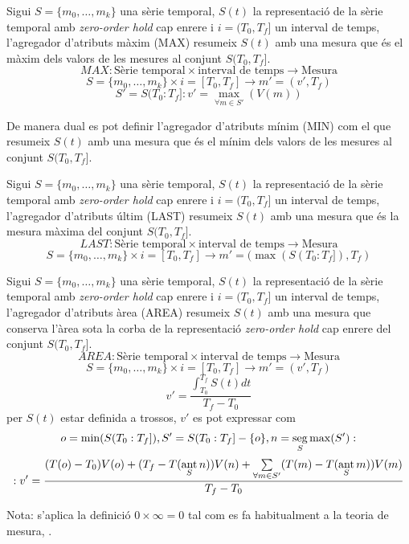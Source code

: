 \begin{definition}
  Sigui $S=\{m_0,\ldots,m_k\}$ una sèrie temporal, $S(t)$ la
  representació de la sèrie temporal amb \emph{zero-order hold} cap
  enrere i $i=(T_0,T_f]$ un interval de temps, l'agregador d'atributs màxim
  (MAX) resumeix $S(t)$ amb una mesura que és el màxim dels valors
  de les mesures al conjunt $S(T_0,T_f]$.
\[
MAX: \text{Sèrie temporal} \times \text{interval de temps} \longrightarrow \text{Mesura}
\]
\[
S=\{m_0,\ldots,m_k\} \times i=[T_0,T_f]  \longrightarrow m'=(v',T_f)
\]
\[
S'=S(T_0:T_f]:
v' = \max_{\forall m \in S'}(V(m))
\]
\end{definition}

De manera dual es pot definir l'agregador d'atributs mínim (MIN) com el
que resumeix $S(t)$ amb una mesura que és el mínim dels valors de les
mesures al conjunt $S(T_0,T_f]$.


\begin{definition}
  Sigui $S=\{m_0,\ldots,m_k\}$ una sèrie temporal, $S(t)$ la
  representació de la sèrie temporal amb \emph{zero-order hold} cap
  enrere i $i=(T_0,T_f]$ un interval de temps, l'agregador d'atributs últim
  (LAST) resumeix $S(t)$ amb una mesura que és la mesura màxima del
  conjunt $S(T_0,T_f]$.
\[
LAST: \text{Sèrie temporal} \times \text{interval de temps} \longrightarrow \text{Mesura}
\]
\[
S=\{m_0,\ldots,m_k\} \times i=[T_0,T_f]  \longrightarrow m'=(\max(S(T_0:T_f]),T_f)
\]
\end{definition}



\begin{definition}
  Sigui $S=\{m_0,\ldots,m_k\}$ una sèrie temporal, $S(t)$ la
  representació de la sèrie temporal amb \emph{zero-order hold} cap
  enrere i $i=(T_0,T_f]$ un interval de temps, l'agregador d'atributs àrea
  (AREA) resumeix $S(t)$ amb una mesura que conserva l'àrea sota la
  corba de la representació \emph{zero-order hold} cap enrere del
  conjunt $S(T_0,T_f]$.
\[
AREA: \text{Sèrie temporal} \times \text{interval de temps} \longrightarrow \text{Mesura}
\]
\[
S=\{m_0,\ldots,m_k\} \times i=[T_0,T_f]  \longrightarrow m'=(v',T_f)
\]
\[
v' = 
\frac{\int_{T_0}^{T_f} S(t) dt}{T_f - T_0}
\]
per $S(t)$ estar definida a trossos, $v'$ es pot expressar com
\[
o=\min(S(T_0:T_f]),
S'= S(T_0:T_f] - \{o\},
n=\seg\limits_S \max(S'): %
\]
\[
:v'= \frac{(T(o)-T_0)V(o) 
+( T_f- T(\operatorname*{ant}\limits_S n) )V(n) 
+\sum\limits_{\forall m \in S'}( T(m)- T(\operatorname*{ant}\limits_S m) )V(m)}
{T_f-T_0} 
\]

Nota: s'aplica la definició $0 \times \infty = 0$ tal com es fa habitualment a la teoria de mesura, \cite{wiki:extendedreal}.
\end{definition}

